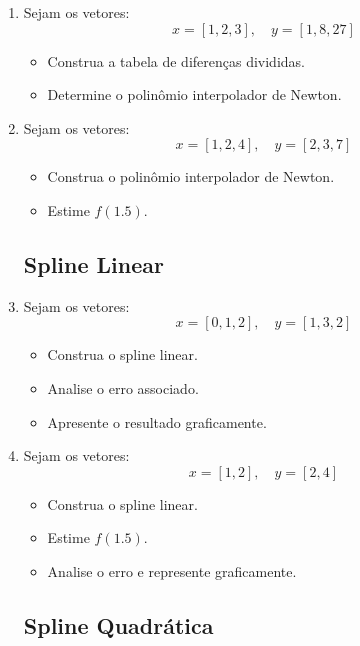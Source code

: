 \begin{enumerate}[label=\thesection.\arabic*]
\subsection*{Interpolação de Newton}

\item Sejam os vetores:
\[
x = [1, 2, 3], \quad y = [1, 8, 27]
\]

\begin{itemize}
    \item Construa a tabela de diferenças divididas.
    \item Determine o polinômio interpolador de Newton.
\end{itemize}

\item Sejam os vetores:
\[
x = [1, 2, 4], \quad y = [2, 3, 7]
\]

\begin{itemize}
    \item Construa o polinômio interpolador de Newton.
    \item Estime $f(1.5)$.
\end{itemize}

\subsection*{Spline Linear}

\item Sejam os vetores:
\[
x = [0, 1, 2], \quad y = [1, 3, 2]
\]

\begin{itemize}
    \item Construa o spline linear.
    \item Analise o erro associado.
    \item Apresente o resultado graficamente.
\end{itemize}

\item Sejam os vetores:
\[
x = [1, 2], \quad y = [2, 4]
\]

\begin{itemize}
    \item Construa o spline linear.
    \item Estime $f(1.5)$.
    \item Analise o erro e represente graficamente.
\end{itemize}

\subsection*{Spline Quadrática}


\end{enumerate}
